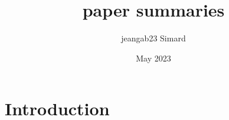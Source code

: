 \documentclass{article}
\title{paper summaries}
\author{jeangab23 Simard}
\date{May 2023}
\begin{document}
\maketitle

\section{Introduction}
\end{document}
